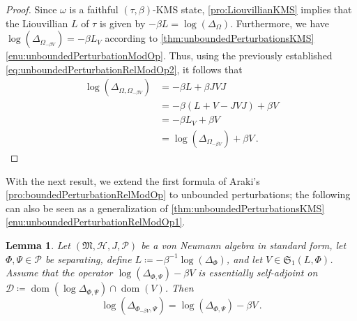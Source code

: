 \documentclass[a4paper, twoside, 11pt, reqno]{amsart}
\theoremstyle{definition}
\theoremstyle{plain}
\newtheorem{lemma}[definition]{Lemma}
\renewcommand{\Delta}{\varDelta}
\renewcommand{\Phi}{\varPhi}
\renewcommand{\Psi}{\varPsi}
\renewcommand{\Omega}{\varOmega}
\newcommand{\MD}{\mathcal{D}}
\newcommand{\MH}{\mathcal{H}}
\newcommand{\MFM}{\mathfrak{M}}
\newcommand{\MFS}{\mathfrak{S}}
\newcommand{\NPC}{\mathcal{P}}
\newcommand{\1}{\mathbf{1}}
\DeclareMathOperator{\dom}{dom}
\newcommand{\ce}{\coloneqq}
\newcommand{\inv}[1]{#1^{-1}}
\begin{document}
\begin{proof}
    Since $\omega$ is a faithful $(\tau, \beta)$-KMS state, \cref{pro:LiouvillianKMS} implies that the Liouvillian $L$ of $\tau$ is given by $- \beta L = \log (\Delta_\Omega)$. Furthermore, we have $\log (\Delta_{\Omega_{- \beta V}}) = - \beta L_V$ according to \cref{thm:unboundedPerturbationsKMS} \ref{enu:unboundedPerturbationModOp}. Thus, using the previously established \cref{eq:unboundedPerturbationRelModOp2}, it follows that
    \begin{align*}
        \log(\Delta_{\Omega, \Omega_{- \beta V}}) &= - \beta L + \beta J V J \\
        &= - \beta ( L + V - J V J) + \beta V \\
        &= - \beta L_V + \beta V \\
        &= \log (\Delta_{\Omega_{- \beta V}}) + \beta V \, . \tag*{\qedhere}
    \end{align*}
\end{proof}

With the next result, we extend the first formula of Araki's \cref{pro:boundedPerturbationRelModOp} to unbounded perturbations; the following can also be seen as a generalization of \cref{thm:unboundedPerturbationsKMS} \ref{enu:unboundedPerturbationRelModOp1}.

\begin{lemma}\label{lem:unboundedPerturbedRelModOp4}
    Let $(\MFM, \MH, J, \NPC)$ be a von Neumann algebra in standard form, let $\Phi, \Psi \in \NPC$ be separating, define $L \ce - \inv{\beta} \log(\Delta_\Phi)$, and let $V \in \MFS_1(L, \Phi)$. Assume that the operator $\log(\Delta_{\Phi, \Psi}) - \beta V$ is essentially self-adjoint on $\MD \ce \dom(\log \Delta_{\Phi, \Psi}) \cap \dom(V)$. Then
    \begin{equation*}
        \log(\Delta_{\Phi_{- \beta V}, \Psi}) = \log(\Delta_{\Phi, \Psi}) - \beta V \, .
    \end{equation*}
\end{lemma}
\end{document}
